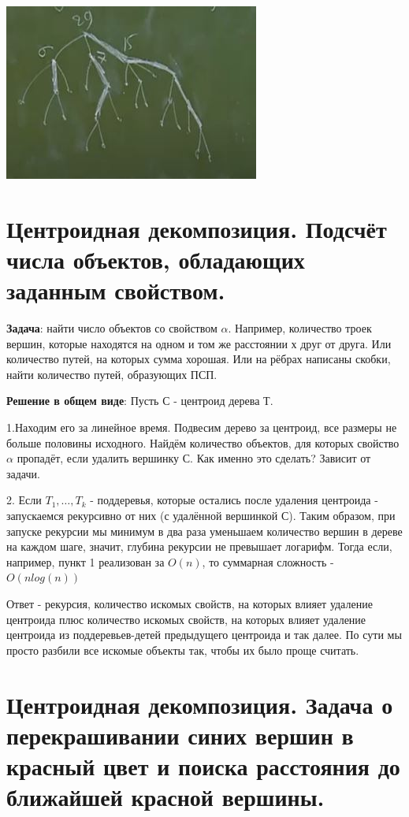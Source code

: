 \includegraphics[]{images/100-102_heavy_light}

\setcounter{section}{100}
\section{Центроидная декомпозиция. Подсчёт числа объектов, обладающих заданным свойством.}

\textbf{Задача}: найти число объектов со свойством $\alpha$. Например, количество троек вершин, которые находятся на одном и том же расстоянии х друг от друга. Или количество путей, на которых сумма хорошая. Или на рёбрах написаны скобки, найти количество путей, образующих ПСП.

\textbf{Решение в общем виде}: Пусть С - центроид дерева Т.

1.Находим его за линейное время. Подвесим дерево за центроид, все размеры не больше половины исходного. Найдём количество объектов, для которых свойство $\alpha$ пропадёт, если удалить вершинку С. Как именно это сделать? Зависит от задачи.

2. Если $T_1, \dots, T_k$ - поддеревья, которые остались после удаления центроида - запускаемся рекурсивно от них (с удалённой вершинкой С). Таким образом, при запуске рекурсии мы минимум в два раза уменьшаем количество вершин в дереве на каждом шаге, значит, глубина рекурсии не превышает логарифм. Тогда если, например, пункт 1 реализован за $O(n)$, то суммарная сложность - $O(n log(n))$ 

Ответ - рекурсия, количество искомых свойств, на которых влияет удаление центроида плюс количество искомых свойств, на которых влияет удаление центроида из поддеревьев-детей предыдущего центроида и так далее. По сути мы просто разбили все искомые объекты так, чтобы их было проще считать.

\setcounter{section}{101}
\section{Центроидная декомпозиция. Задача о перекрашивании синих вершин в красный цвет и поиска расстояния до ближайшей красной вершины.}

